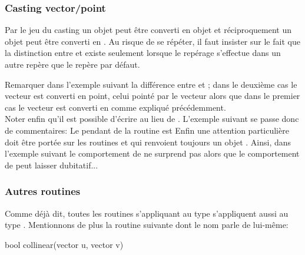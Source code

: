 \documentclass[pdftex]{article}
\begin{document}
\subsubsection{\og{}Casting\fg{} vector/point}
Par le jeu du \og{}casting\fg{} un objet  peut être
converti en objet  et réciproquement un objet
 peut être converti en . Au risque de se
répéter, il faut insister sur le fait que la distinction entre
 et  existe seulement lorsque le repérage
s'effectue dans un autre repère que le repère par défaut.

Remarquer dans l'exemple suivant la différence entre  et
; dans le deuxième cas le vecteur est converti en
point, celui \og{}pointé par le vecteur\fg{} alors que dans le premier
cas le vecteur est converti en  comme expliqué
précédemment.\\
Noter enfin qu'il est possible d'écrire  au lieu de
.
L'exemple suivant se passe donc de commentaires:
Le pendant de la routine  est
Enfin une attention particulière doit être portée sur les routines
 et\linebreak
{} qui renvoient toujours
un objet . Ainsi, dans l'exemple suivant le comportement de
 ne surprend pas alors que le comportement
de  peut laisser dubitatif...

\subsubsection{Autres routines}
Comme déjà dit, toutes les
routines s'appliquant au type  s'appliquent aussi au type
. Mentionnons de plus la routine suivante dont le nom parle de lui-même:
\begin{Vcolor}
  bool collinear(vector u, vector v)
\end{Vcolor}
\end{document}
